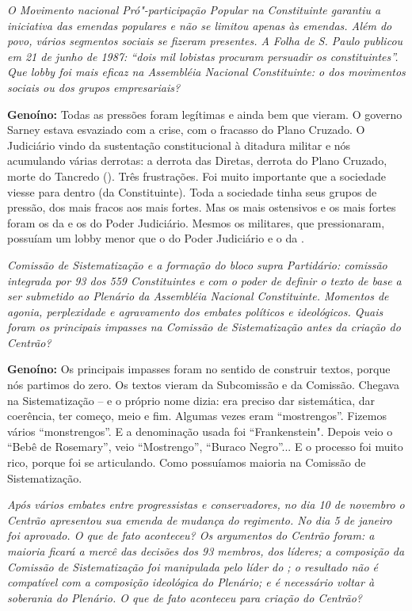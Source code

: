 \emph{O Movimento nacional Pró"-participação Popular na Constituinte
garantiu a iniciativa das emendas populares e não se limitou apenas às
emendas. Além do povo, vários segmentos sociais se fizeram presentes. A
Folha de S. Paulo publicou em 21 de junho de 1987: ``dois mil lobistas
procuram persuadir os constituintes''. Que lobby foi mais eficaz na
Assembléia Nacional Constituinte: o dos movimentos sociais ou dos grupos
empresariais?}

\textbf{Genoíno:} Todas as pressões foram legítimas e ainda bem que
vieram. O governo Sarney estava esvaziado com a crise, com o fracasso do
Plano Cruzado. O Judiciário vindo da sustentação constitucional à
ditadura militar e nós acumulando várias derrotas: a derrota das
Diretas, derrota do Plano Cruzado, morte do Tancredo (). Três
frustrações. Foi muito importante que a sociedade viesse para dentro (da
Constituinte). Toda a sociedade tinha seus grupos de pressão, dos mais
fracos aos mais fortes. Mas os mais ostensivos e os mais fortes foram os
da  e os do Poder Judiciário. Mesmos os militares, que pressionaram,
possuíam um lobby menor que o do Poder Judiciário e o da .

\emph{Comissão de Sistematização e a formação do bloco supra
Partidário: comissão integrada por 93 dos 559 Constituintes e com o
poder de definir o texto de base a ser submetido ao Plenário da
Assembléia Nacional Constituinte. Momentos de agonia, perplexidade e
agravamento dos embates políticos e ideológicos. Quais foram os
principais impasses na Comissão de Sistematização antes da criação do
Centrão?}

\textbf{Genoíno:} Os principais impasses foram no sentido de construir
textos, porque nós partimos do zero. Os textos vieram da Subcomissão e
da Comissão. Chegava na Sistematização -- e o próprio nome dizia: era
preciso dar sistemática, dar coerência, ter começo, meio e fim. Algumas
vezes eram ``mostrengos''. Fizemos vários ``monstrengos''. E a
denominação usada foi ``Frankenstein". Depois veio o ``Bebê de
Rosemary'', veio ``Mostrengo'', ``Buraco Negro''... E o processo foi
muito rico, porque foi se articulando. Como possuíamos maioria na
Comissão de Sistematização.

\emph{Após vários embates entre progressistas e conservadores, no dia
10 de novembro o Centrão apresentou sua emenda de mudança do regimento.
No dia 5 de janeiro foi aprovado. O que de fato aconteceu? Os argumentos
do Centrão foram: a maioria ficará a mercê das decisões dos 93 membros,
dos líderes; a composição da Comissão de Sistematização foi manipulada
pelo líder do ; o resultado não é compatível com a composição
ideológica do Plenário; e é necessário voltar à soberania do Plenário. O
que de fato aconteceu para criação do Centrão?}

